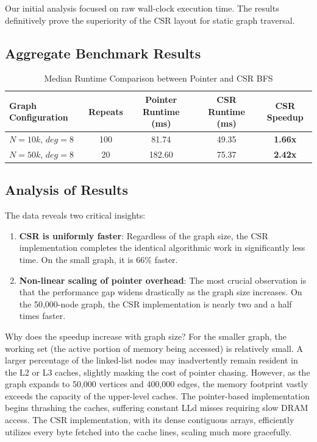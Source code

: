 \documentclass[11pt]{article}
\begin{document}
Our initial analysis focused on raw wall-clock execution time. The results definitively prove the superiority of the CSR layout for static graph traversal.

\subsection{Aggregate Benchmark Results}

\begin{table}[H]
\centering
\caption{Median Runtime Comparison between Pointer and CSR BFS}
\vspace{0.2cm}
\begin{tabular}{@{}lcccc@{}}
\toprule
\textbf{Graph Configuration} & \textbf{Repeats} & \textbf{Pointer Runtime (ms)} & \textbf{CSR Runtime (ms)} & \textbf{CSR Speedup} \\ \midrule
$N=10k$, $deg=8$   & 100 & 81.74 & 49.35 & \textbf{1.66x} \\
$N=50k$, $deg=8$   & 20  & 182.60 & 75.37 & \textbf{2.42x} \\ \bottomrule
\end{tabular}
\end{table}

\subsection{Analysis of Results}

The data reveals two critical insights:
\begin{enumerate}
    \item \textbf{CSR is uniformly faster}: Regardless of the graph size, the CSR implementation completes the identical algorithmic work in significantly less time. On the small graph, it is $66\%$ faster.
    \item \textbf{Non-linear scaling of pointer overhead}: The most crucial observation is that the performance gap widens drastically as the graph size increases. On the 50,000-node graph, the CSR implementation is nearly two and a half times faster.
\end{enumerate}

Why does the speedup increase with graph size? For the smaller graph, the working set (the active portion of memory being accessed) is relatively small. A larger percentage of the linked-list nodes may inadvertently remain resident in the L2 or L3 caches, slightly masking the cost of pointer chasing. However, as the graph expands to 50,000 vertices and 400,000 edges, the memory footprint vastly exceeds the capacity of the upper-level caches. The pointer-based implementation begins thrashing the caches, suffering constant LLd misses requiring slow DRAM access. The CSR implementation, with its dense contiguous arrays, efficiently utilizes every byte fetched into the cache lines, scaling much more gracefully.
\end{document}
